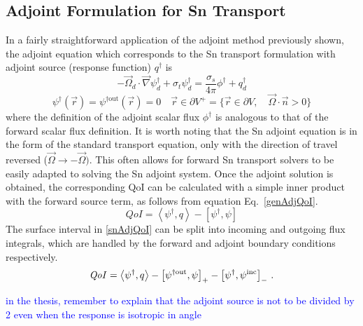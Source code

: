\documentclass{article}
\newcommand{\vr}{\vec{r}}
\newcommand{\vO}{\vec{\Omega}}
\newcommand{\bra}{\left\langle}
\newcommand{\ket}{\right\rangle}
\newcommand{\sbra}{\left[}
\newcommand{\sket}{\right]}
\newcommand{\grad}{\vec{\nabla}}
\newcommand{\bound}{\partial V}
\newcommand{\sigt}{\sigma_t}
\newcommand{\sigs}{\sigma_s}
\newcommand{\angSource}{q}
\newcommand{\angResp}{q^\dag}
\newcommand{\qoi}{{\it QoI}\xspace}
\newcommand{\comment}[2]{\marginpar{\textcolor{#2}{$\star$}}\textcolor{#2}{#1}\newline}
\newcommand{\jcr}[1]{\comment{#1}{blue}}
\newcommand{\jcr}[1]{\phantom{a}}
\begin{document}
\subsection{Adjoint Formulation for Sn Transport}
In a fairly straightforward application of the adjoint method previously shown, the adjoint equation which corresponds to the Sn transport formulation with adjoint source (response function)
$\angResp$ is
\begin{equation}
\label{snAdj}
- \vO_d \cdot \grad \psi^\dag_d + \sigt \psi^\dag_d = \frac{\sigs}{4 \pi} \phi^\dag + \angResp_d
\end{equation}
%
\begin{equation}
\psi^\dag(\vr) = \psi^{\dag \text{out}}(\vr)=0 \quad \vr \in \partial V^{+} = \{  \vr \in \bound , \quad \vO \cdot \vec{n} > 0 \}
\end{equation}
where the definition of the adjoint scalar flux $\phi^\dag$ is analogous to that of 
the forward scalar flux definition. It is worth noting that the Sn adjoint equation is in the form of the standard transport equation, only with the direction of travel reversed ($\vO \to -\vO)$. This often allows for forward Sn transport solvers to be easily adapted to solving the Sn adjoint system. Once the adjoint solution is obtained, the corresponding QoI can be calculated with a simple inner product with the forward source term, as follows from equation Eq.~\eqref{genAdjQoI}. %
\begin{equation}
\label{snAdjQoI}
QoI = \bra \psi^\dag , \angSource \ket - \sbra \psi^\dag,  \psi \sket
\end{equation}
%
The surface interval in \eqref{snAdjQoI} can be split into incoming and outgoing flux integrals, which are handled by the forward and adjoint boundary conditions respectively. 
%
\begin{equation}
\label{snAdjQoIBCsplit}
\qoi = \bra \psi^\dag , q \ket - \sbra \psi^{\dag \text{out}},  \psi \sket_+ - \sbra \psi^\dag,  \psi^{\text{inc}} \sket_- \,.
\end{equation}

\jcr{in the thesis, remember to explain that the adjoint source is not to be divided by 2 even when the response is isotropic in angle}

\end{document}
